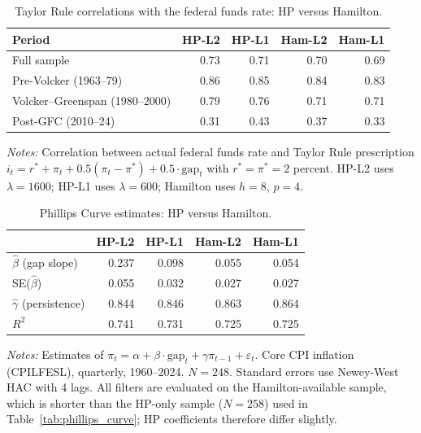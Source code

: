 \documentclass[10pt]{article}
\begin{document}
\begin{table}[htbp]
\centering
\caption{Taylor Rule correlations with the federal funds rate: HP versus Hamilton.}
\label{tab:hamilton_taylor}
\begin{tabular}{l rrrr}
\toprule
Period & HP-L2 & HP-L1 & Ham-L2 & Ham-L1 \\
\midrule
Full sample            & 0.73 & 0.71 & 0.70 & 0.69 \\
Pre-Volcker (1963--79) & 0.86 & 0.85 & 0.84 & 0.83 \\
Volcker--Greenspan (1980--2000) & 0.79 & 0.76 & 0.71 & 0.71 \\
Post-GFC (2010--24)    & 0.31 & 0.43 & 0.37 & 0.33 \\
\bottomrule
\end{tabular}
\begin{tablenotes}
\small
\item \textit{Notes:} Correlation between actual federal funds rate and Taylor Rule prescription $i_t = r^* + \pi_t + 0.5(\pi_t - \pi^*) + 0.5 \cdot \text{gap}_t$ with $r^* = \pi^* = 2$ percent. HP-L2 uses $\lambda = 1600$; HP-L1 uses $\lambda = 600$; Hamilton uses $h = 8$, $p = 4$.
\end{tablenotes}
\end{table}

\begin{table}[htbp]
\centering
\caption{Phillips Curve estimates: HP versus Hamilton.}
\label{tab:hamilton_phillips}
\begin{tabular}{l rrrr}
\toprule
& HP-L2 & HP-L1 & Ham-L2 & Ham-L1 \\
\midrule
$\hat{\beta}$ (gap slope) & 0.237 & 0.098 & 0.055 & 0.054 \\
SE($\hat{\beta}$)         & 0.055 & 0.032 & 0.027 & 0.027 \\
$\hat{\gamma}$ (persistence) & 0.844 & 0.846 & 0.863 & 0.864 \\
$R^2$                     & 0.741 & 0.731 & 0.725 & 0.725 \\
\bottomrule
\end{tabular}
\begin{tablenotes}
\small
\item \textit{Notes:} Estimates of $\pi_t = \alpha + \beta \cdot \text{gap}_t + \gamma \pi_{t-1} + \varepsilon_t$. Core CPI inflation (CPILFESL), quarterly, 1960--2024. $N = 248$. Standard errors use Newey-West HAC with 4 lags. All filters are evaluated on the Hamilton-available sample, which is shorter than the HP-only sample ($N = 258$) used in Table~\ref{tab:phillips_curve}; HP coefficients therefore differ slightly.
\end{tablenotes}
\end{table}
\end{document}
